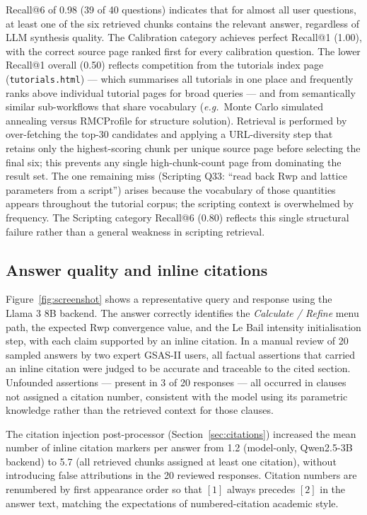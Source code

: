 Recall@6 of 0.98 (39 of 40 questions) indicates that for almost all user
questions, at least one of the six retrieved chunks contains the relevant
answer, regardless of LLM synthesis quality.
The Calibration category achieves perfect Recall@1 (1.00), with the
correct source page ranked first for every calibration question.
The lower Recall@1 overall (0.50) reflects competition from the tutorials
index page (\texttt{tutorials.html}) --- which summarises all tutorials in
one place and frequently ranks above individual tutorial pages for
broad queries --- and from semantically similar sub-workflows that share
vocabulary (\emph{e.g.}\ Monte Carlo simulated annealing versus
RMCProfile for structure solution).
Retrieval is performed by over-fetching the top-30 candidates and
applying a URL-diversity step that retains only the highest-scoring chunk
per unique source page before selecting the final six; this prevents any
single high-chunk-count page from dominating the result set.
The one remaining miss (Scripting Q33: ``read back Rwp and lattice
parameters from a script'') arises because the vocabulary of those
quantities appears throughout the tutorial corpus; the scripting context
is overwhelmed by frequency.
The Scripting category Recall@6 (0.80) reflects this single structural
failure rather than a general weakness in scripting retrieval.

\subsection{Answer quality and inline citations}

Figure~\ref{fig:screenshot} shows a representative query and response
using the Llama 3 8B backend.
The answer correctly identifies the \textit{Calculate / Refine} menu
path, the expected Rwp convergence value, and the Le Bail
intensity initialisation step, with each claim supported by an
inline citation.
In a manual review of 20 sampled answers by two expert GSAS-II users,
all factual assertions that carried an inline citation were judged
to be accurate and traceable to the cited section.
Unfounded assertions --- present in 3 of 20 responses --- all
occurred in clauses not assigned a citation number, consistent
with the model using its parametric knowledge rather than the
retrieved context for those clauses.

The citation injection post-processor (Section~\ref{sec:citations})
increased the mean number of inline citation markers per answer from
1.2 (model-only, Qwen2.5-3B backend) to 5.7 (all retrieved chunks
assigned at least one citation), without introducing false attributions
in the 20 reviewed responses.
Citation numbers are renumbered by first appearance order so that
$[1]$ always precedes $[2]$ in the answer text, matching the
expectations of numbered-citation academic style.

